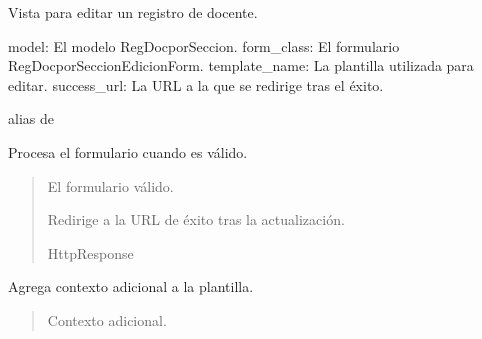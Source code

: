 \documentclass[letterpaper,10pt,spanish]{sphinxmanual}
\begin{document}
\begin{fulllineitems}

\pysigstartsignatures
{}
\pysigstopsignatures
\sphinxAtStartPar
Vista para editar un registro de docente.
\begin{description}
\sphinxAtStartPar
model: El modelo RegDocporSeccion.
form\_class: El formulario RegDocporSeccionEdicionForm.
template\_name: La plantilla utilizada para editar.
success\_url: La URL a la que se redirige tras el éxito.

\end{description}


\begin{fulllineitems}

\pysigstartsignatures
{}
\pysigstopsignatures
\sphinxAtStartPar
alias de 

\end{fulllineitems}



\begin{fulllineitems}

\pysigstartsignatures
{}
\pysigstopsignatures
\sphinxAtStartPar
Procesa el formulario cuando es válido.
\begin{quote}\begin{description}
\sphinxAtStartPar
{} \textendash{} El formulario válido.

\sphinxAtStartPar
Redirige a la URL de éxito tras la actualización.

\sphinxAtStartPar
HttpResponse

\end{description}\end{quote}

\end{fulllineitems}



\begin{fulllineitems}

\pysigstartsignatures
{}
\pysigstopsignatures
\sphinxAtStartPar
Agrega contexto adicional a la plantilla.
\begin{quote}\begin{description}
\sphinxAtStartPar
{} \textendash{} Contexto adicional.


\end{description}
\end{quote}
\end{fulllineitems}
\end{fulllineitems}
\end{document}
